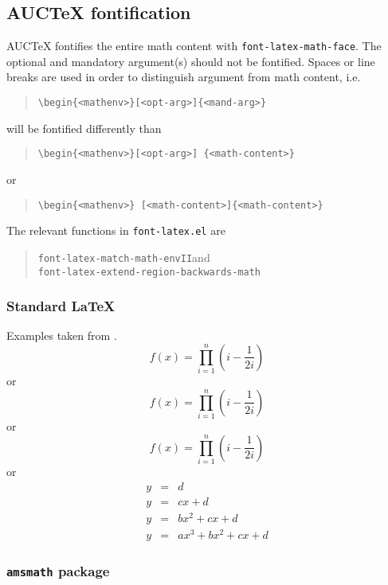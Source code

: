 \documentclass[a4paper]{article}
\begin{document}
\subsection{AUC\protect\TeX{} fontification}

AUC\TeX{} fontifies the entire math content with
\texttt{font-latex-math-face}.  The optional and mandatory argument(s)
should not be fontified.  Spaces or line breaks are used in order to
distinguish argument from math content, i.e.
\begin{quote}
  \verb|\begin{<mathenv>}[<opt-arg>]{<mand-arg>}|
\end{quote}
will be fontified differently than
\begin{quote}
  \verb|\begin{<mathenv>}[<opt-arg>] {<math-content>}|
\end{quote}
or
\begin{quote}
  \verb|\begin{<mathenv>} [<math-content>]{<math-content>}|
\end{quote}

The relevant functions in \verb|font-latex.el| are
\begin{quote}
  \verb|font-latex-match-math-envII|\quad and \\
  \verb|font-latex-extend-region-backwards-math|
\end{quote}

\subsubsection{Standard \protect\LaTeX{}}

Examples taken from \cite{voss16}.
\begin{equation}
  f(x)=\prod_{i=1}^{n}\left(i-\frac{1}{2i}\right)
\end{equation}
or
\begin{displaymath}
  f(x)=\prod_{i=1}^{n}\left(i-\frac{1}{2i}\right)
\end{displaymath}
or
\[ f(x)=\prod_{i=1}^{n}\left(i-\frac{1}{2i}\right) \]
or
\begin{eqnarray*}
  y & = & d\\
  y & = & cx+d\\
  y & = & bx^{2}+cx+d\\
  y & = & ax^{3}+bx^{2}+cx+d
\end{eqnarray*}

\subsubsection{\texttt{amsmath} package}
\end{document}
